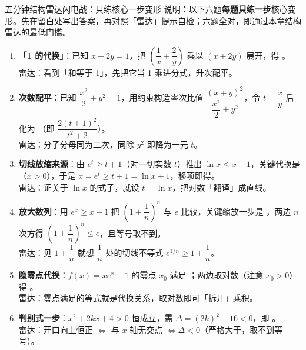 \begin{warmupbox}{五分钟结构雷达闪电战：只练核心一步变形}
说明：以下六题\textbf{每题只练一步}核心变形。先在留白处写出答案，再对照「雷达」提示自检；六题全对，即通过本章结构雷达的最低门槛。

\begin{enumerate}[label=(\arabic*), itemsep=4pt]
\item \textbf{「1 的代换」}：已知 $x+2y=1$，把 $\left(\dfrac1x+\dfrac2y\right)$ 乘以 $(x+2y)$ 展开，得 。\\
{\small\textcolor{third}{雷达：看到「和等于 1」，先把它当 1 乘进分式，升次配平。}}

\item \textbf{次数配平}：已知 $\dfrac{x^2}{2}+y^2=1$，用约束构造零次比值 $\dfrac{(x+y)^2}{\dfrac{x^2}{2}+y^2}$，令 $t=\dfrac xy$ 后化为 （即 $\dfrac{2(t+1)^2}{t^2+2}$）。\\
{\small\textcolor{third}{雷达：分子分母同为二次，同除 $y^2$ 即降为一元 $t$。}}

\item \textbf{切线放缩来源}：由 $e^t\ge t+1$（对一切实数 $t$）推出 $\ln x\le x-1$，关键代换是 （$x>0$），于是 $x=e^t\ge t+1=\ln x+1$，移项即得。\\
{\small\textcolor{third}{雷达：证关于 $\ln x$ 的式子，就设 $t=\ln x$，把对数「翻译」成直线。}}

\item \textbf{放大数列}：用 $e^x\ge x+1$ 把 $\left(1+\dfrac1n\right)^n$ 与 $e$ 比较，关键缩放一步是 ，两边 $n$ 次方得 $\left(1+\dfrac1n\right)^n\le e$，且等号取不到。\\
{\small\textcolor{third}{雷达：见 $1+\dfrac1n$ 就想 $\dfrac1n$ 处的切线不等式 $e^{1/n}\ge1+\dfrac1n$。}}

\item \textbf{隐零点代换}：$f(x)=x e^x-1$ 的零点 $x_0$ 满足 ；两边取对数（注意 $x_0>0$）得 。\\
{\small\textcolor{third}{雷达：零点满足的等式就是代换关系，取对数即可「拆开」乘积。}}

\item \textbf{判别式一步}：$x^2+2kx+4>0$ 恒成立，需 $\Delta=(2k)^2-16<0$，即 。\\
{\small\textcolor{third}{雷达：开口向上恒正 $\iff$ 与 $x$ 轴无交点 $\iff \Delta<0$（严格大于，取不到等号）。}}
\end{enumerate}
\end{warmupbox}

